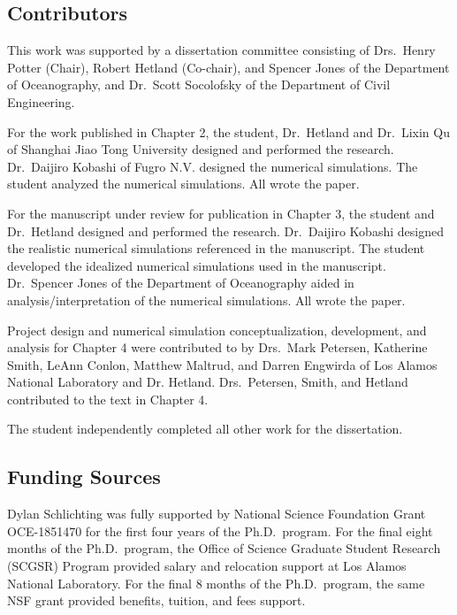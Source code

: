 

\begin{contributors}
\subsection*{Contributors}
This work was supported by a dissertation committee consisting of Drs.~Henry Potter (Chair), Robert Hetland (Co-chair), and Spencer Jones of the Department of Oceanography, and Dr.~Scott Socolofsky of the Department of Civil Engineering.

For the work published in Chapter 2, the student, Dr.~Hetland and Dr.~Lixin Qu of Shanghai Jiao Tong University designed and performed the research. Dr.~Daijiro Kobashi of Fugro N.V. designed the numerical simulations. The student analyzed the numerical simulations. All wrote the paper. 

For the manuscript under review for publication in Chapter 3, the student and Dr.~Hetland designed and performed the research. Dr.~Daijiro Kobashi designed the realistic numerical simulations referenced in the manuscript. The student developed the idealized numerical simulations used in the manuscript. Dr.~Spencer Jones of the Department of Oceanography aided in analysis/interpretation of the numerical simulations. All wrote the paper. 

Project design and numerical simulation conceptualization, development, and analysis for Chapter 4 were contributed to by Drs.~Mark Petersen, Katherine Smith, LeAnn Conlon, Matthew Maltrud, and Darren Engwirda of Los Alamos National Laboratory and Dr. Hetland.  Drs.~Petersen, Smith, and Hetland contributed to the text in Chapter 4. 

The student independently completed all other work for the dissertation.

\subsection*{Funding Sources}
Dylan Schlichting was fully supported by National Science Foundation Grant OCE-1851470 for the first four years of the Ph.D.~program. For the final eight months of the Ph.D.~program, the Office of Science Graduate Student Research (SCGSR) Program provided salary and relocation support at Los Alamos National Laboratory. For the final 8 months of the Ph.D.~program, the same NSF grant provided benefits, tuition, and fees support. 
\end{contributors}